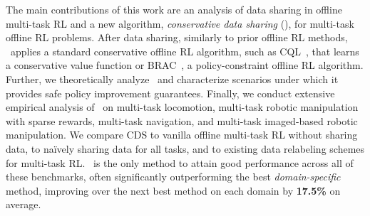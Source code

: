 The main contributions of this work are an analysis of data sharing in offline multi-task RL and a new algorithm, \textit{conservative data sharing} (\cdsmethodname), for multi-task offline RL problems.  
After data sharing, similarly to prior offline RL methods, \cdsmethodname\ applies a standard conservative offline RL algorithm, such as CQL~\citep{kumar2020conservative}, that learns a conservative value function or BRAC~\citep{wu2019behavior}, a policy-constraint offline RL algorithm. Further, we theoretically analyze \cdsmethodname\ and characterize scenarios under which it provides safe policy improvement guarantees. Finally, we conduct extensive empirical analysis of \cdsmethodname\ on multi-task locomotion, multi-task robotic manipulation with sparse rewards, multi-task navigation, and multi-task imaged-based robotic manipulation. We compare CDS to vanilla offline multi-task RL without sharing data, to na\"{i}vely sharing data for all tasks, and to existing data relabeling schemes for multi-task RL. \cdsmethodname\ is the only method to attain good performance across all of these benchmarks, often significantly outperforming the best \textit{domain-specific} method, improving over the next best method on each domain by \textbf{17.5\%} on average.
